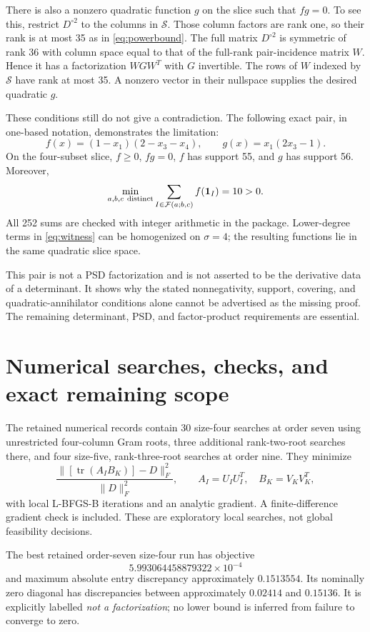 \documentclass[11pt]{article}
\theoremstyle{remark}\newtheorem{remark}[theorem]{Remark}
\newcommand{\tr}{\operatorname{tr}}
\newcommand{\one}{\mathbf 1}
\begin{document}
There is also a nonzero quadratic function $g$ on the slice such that $fg=0$. To see this, restrict $D^{\circ2}$ to the columns in $\mathcal S$. Those column factors are rank one, so their rank is at most 35 as in \eqref{eq:powerbound}. The full matrix $D^{\circ2}$ is symmetric of rank 36 with column space equal to that of the full-rank pair-incidence matrix $W$. Hence it has a factorization $WGW^T$ with $G$ invertible. The rows of $W$ indexed by $\mathcal S$ have rank at most 35. A nonzero vector in their nullspace supplies the desired quadratic $g$.

These conditions still do not give a contradiction. The following exact pair, in one-based notation, demonstrates the limitation:
\begin{equation}\label{eq:witness}
 f(x)=(1-x_1)(2-x_3-x_4),\qquad
 g(x)=x_1(2x_3-1).
\end{equation}
On the four-subset slice, $f\geq0$, $fg=0$, $f$ has support 55, and $g$ has support 56. Moreover,
\[
 \min_{a,b,c\ {\rm distinct}}
 \sum_{I\in\mathcal F(a;b,c)}f(\one_I)=10>0.
\]
All 252 sums are checked with integer arithmetic in the package. Lower-degree terms in \eqref{eq:witness} can be homogenized on $\sigma=4$; the resulting functions lie in the same quadratic slice space.

This pair is not a PSD factorization and is not asserted to be the derivative data of a determinant. It shows why the stated nonnegativity, support, covering, and quadratic-annihilator conditions alone cannot be advertised as the missing proof. The remaining determinant, PSD, and factor-product requirements are essential.

\section{Numerical searches, checks, and exact remaining scope}
The retained numerical records contain 30 size-four searches at order seven using unrestricted four-column Gram roots, three additional rank-two-root searches there, and four size-five, rank-three-root searches at order nine. They minimize
\[
 \frac{\|[\tr(A_I B_K)]-D\|_F^2}{\|D\|_F^2},
 \qquad A_I=U_IU_I^T,\quad B_K=V_KV_K^T,
\]
with local L-BFGS-B iterations and an analytic gradient. A finite-difference gradient check is included. These are exploratory local searches, not global feasibility decisions.

The best retained order-seven size-four run has objective
\[
 5.993064458879322\times10^{-4}
\]
and maximum absolute entry discrepancy approximately $0.1513554$. Its nominally zero diagonal has discrepancies between approximately $0.02414$ and $0.15136$. It is explicitly labelled \emph{not a factorization}; no lower bound is inferred from failure to converge to zero.
\end{document}
